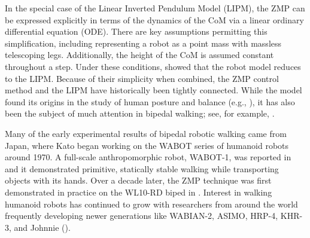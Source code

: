 In the special case of the Linear Inverted Pendulum Model (LIPM),
%
%
the ZMP can be expressed explicitly in terms of the dynamics of the CoM via a linear ordinary differential equation (ODE).
%
There are key assumptions permitting this simplification, including representing a robot as a point mass with massless telescoping legs.
%
Additionally, the height of the CoM is assumed constant throughout a step.
%
Under these conditions, \cite{Kajita1991} showed that the robot model reduces to the LIPM.
%
%
Because of their simplicity when combined, the ZMP control method and the LIPM have historically been tightly connected.
%
%
%
%
While the model found its origins in the study of human posture and balance (e.g., \cite{Geursen1976,Winter1995,Patton1999}), it has also been the subject of much attention in bipedal walking; see, for example, \cite{Miura1984,Kajita2001,Kajita2010}.
%



Many of the early experimental results of bipedal robotic walking came from Japan, where Kato began working on the WABOT series of humanoid robots around 1970.
%
A full-scale anthropomorphic robot, WABOT-1, was reported in \cite{Kato1974} and it demonstrated primitive, statically stable walking while transporting objects with its hands.
%
Over a decade later, the ZMP technique was first demonstrated in practice on the WL10-RD biped in \cite{Takanishi1985}.
%
Interest in walking humanoid robots has continued to grow with researchers from around the world frequently developing newer generations like WABIAN-2, ASIMO, HRP-4, KHR-3, and Johnnie (\cite{Ogura2006,Sakagami2002,Kaneko2011,Park2005,Pfeiffer2002}).
%


